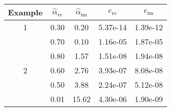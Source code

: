 \begin{tabular*}{\textwidth}{@{\extracolsep{\fill}}ccccc}
\toprule
\multicolumn{1}{c}{Example} & \multicolumn{1}{c}{\(\hat{\alpha}_\text{re}\)} & \multicolumn{1}{c}{\(\hat{\alpha}_\text{im}\)} & \multicolumn{1}{c}{\(e_\text{re}\)} & \multicolumn{1}{c}{\(e_\text{im}\)} \\
\midrule
\multirow{1}{*}{1}&      0.30 &           0.20 &       5.37e-14 &       1.39e-12 \\
\midrule
\multirow{5}{*}{2}&      0.70 &           0.10 &       1.16e-05 &       1.87e-05 \\
                   &      0.80 &           1.57 &       1.51e-08 &       1.94e-08 \\
                   &      0.60 &           2.76 &       3.93e-07 &       8.08e-08 \\
                   &      0.50 &           3.88 &       2.24e-07 &       5.12e-08 \\
                   &      0.01 &          15.62 &       4.30e-06 &       1.90e-09 \\
\bottomrule
\end{tabular*}
